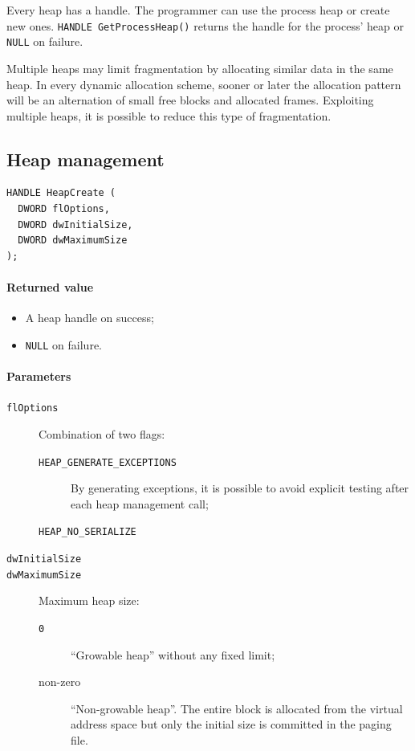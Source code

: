 Every heap has a handle. The programmer can use the process heap or create new ones. \texttt{HANDLE GetProcessHeap()} returns the handle for the process' heap or \texttt{NULL} on failure.

Multiple heaps may limit fragmentation by allocating similar data in the same heap. In every dynamic allocation scheme, sooner or later the allocation pattern will be an alternation of small free blocks and allocated frames. Exploiting multiple heaps, it is possible to reduce this type of fragmentation.

\subsection{Heap management}
\begin{verbatim}
HANDLE HeapCreate (
  DWORD flOptions,
  DWORD dwInitialSize,
  DWORD dwMaximumSize
);
\end{verbatim}

\paragraph{Returned value}
\begin{itemize}
\item A heap handle on success;
\item \texttt{NULL} on failure.
\end{itemize}

\paragraph{Parameters}
\begin{description}
\item [\texttt{flOptions}] Combination of two flags:
\begin{description}
\item [\texttt{HEAP\_GENERATE\_EXCEPTIONS}] By generating exceptions, it is possible to avoid explicit testing after each heap management call;
\item [\texttt{HEAP\_NO\_SERIALIZE}]
\end{description}
\item [\texttt{dwInitialSize}]
\item [\texttt{dwMaximumSize}] Maximum heap size:
\begin{description}
\item [\texttt{0}] ``Growable heap'' without any fixed limit;
\item [non-zero] ``Non-growable heap''. The entire block is allocated from the virtual address space but only the initial size is committed in the paging file.
\end{description}
\end{description}

